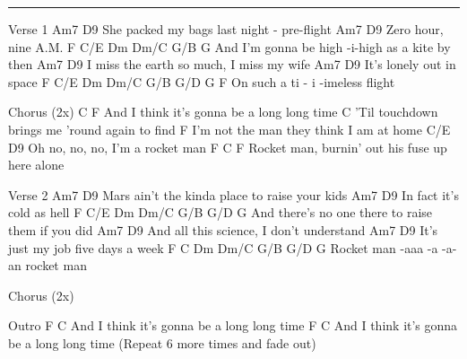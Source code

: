 \noindent\rule{\columnwidth}{1pt}

\begin{lstsong} 
Verse 1
Am7                                    D9
   She packed my bags last night - pre-flight
Am7                D9
   Zero hour, nine A.M.
F                  C/E     Dm    Dm/C              G/B   G
  And I'm gonna be high -i-high       as a kite by then
Am7                            D9
   I miss the earth so much, I miss my wife
Am7                   D9
   It's lonely out in space
F           C/E     Dm             Dm/C    G/B   G/D   G     F
  On such a ti - i -imeless flight

Chorus (2x)
C                                      F
 And I think it's gonna be a long long time
                                         C
'Til touchdown brings me 'round again to find
                                   F
I'm not the man they think I am at home
           C/E       D9
Oh no, no, no, I'm a rocket man
F                                   C           F
Rocket man, burnin' out his fuse up here alone

Verse 2
Am7                              D9
   Mars ain't the kinda place to raise your kids
Am7                      D9
    In fact it's cold as hell
F                     C/E      Dm         Dm/C         G/B   G/D   G
   And there's no one there to raise them       if you did
Am7                                    D9
    And all this science, I don't understand
Am7                              D9
    It's just my job five days a week
       F     C           Dm    Dm/C        G/B   G/D   G
Rocket man  -aaa  -a -a- an         rocket man
 
Chorus (2x)
 
Outro
F                             C
  And I think it's gonna be a long long time
F                             C
  And I think it's gonna be a long long time
(Repeat 6 more times and fade out)
\end{lstsong}
\newpage

